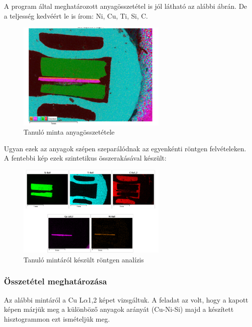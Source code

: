 \documentclass[a4paper,12pt]{article}
\begin{document}
\par A program által meghatározott anyagösszetétel is jól látható az alábbi ábrán. De a teljesség kedvéért
le is írom: Ni, Cu, Ti, Si, C.

\begin{figure}[H]
	\centering
	\includegraphics[width=0.65\textwidth, height=0.45\textwidth]{Jcsop/elsoanyag.png}
	\caption{Tanuló minta anyagösszetétele}
\end{figure}

\par Ugyan ezek az anyagok szépen szeparálódnak az egyenkénti röntgen felvételeken. A fentebbi kép ezek
szintetikus összerakásával készült:

\begin{figure}[H]
	\centering
	\includegraphics[width=0.65\textwidth, height=0.45\textwidth]{Jcsop/elsortg.png}
	\caption{Tanuló mintáról készült röntgen analízis}
\end{figure}

\subsubsection{ Összetétel meghatározása}

\par Az alábbi mintáról a Cu L$\alpha$1,2 képet vizsgáltuk. A feladat
az volt, hogy a kapott képen márjük meg a különböző anyagok arányát (Cu-Ni-Si)
majd a készített hisztogrammon ezt ismételjük meg.
\end{document}
